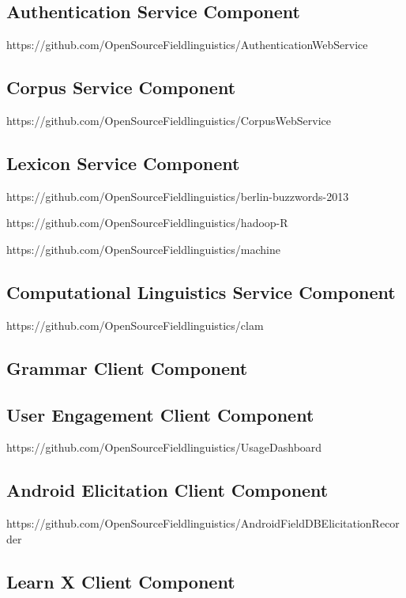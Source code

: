 \documentclass[12pt]{article}
\begin{document}
\subsection{Authentication Service Component}

https://github.com/OpenSourceFieldlinguistics/AuthenticationWebService


\subsection{Corpus Service Component}

https://github.com/OpenSourceFieldlinguistics/CorpusWebService

\subsection{Lexicon Service Component}


https://github.com/OpenSourceFieldlinguistics/berlin-buzzwords-2013

https://github.com/OpenSourceFieldlinguistics/hadoop-R

https://github.com/OpenSourceFieldlinguistics/machine

\subsection{Computational Linguistics Service Component}

https://github.com/OpenSourceFieldlinguistics/clam

\subsection{Grammar Client Component}

\subsection{User Engagement Client Component}

https://github.com/OpenSourceFieldlinguistics/UsageDashboard

\subsection{Android Elicitation Client Component}

https://github.com/OpenSourceFieldlinguistics/AndroidFieldDBElicitationRecorder

\subsection{Learn X Client Component}
\end{document}
